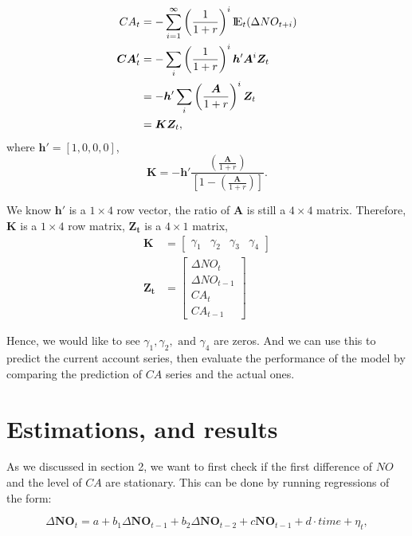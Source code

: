 \documentclass[12pt]{article}
\begin{document}
\begin{align*}
CA_{t} &=  - \sum\limits_{i = 1} ^\infty \left( \frac{1}{1 + r} \right) ^{i}
{\rm I\!{E}}_{t}(\Delta NO_{t + i})\\
\bm{CA}_{t}' &=  - \sum\limits_{i} \left( \frac{1}{1 + r} \right)^{i} \bm{h}'\bm{A}^{i}
\bm{Z}_{t}\\
 &= - \bm{h}' \sum\limits_{i} \left( \frac{\bm{A}}{1 + r} \right)^{i} \bm{Z}_{t}\\
 &= \bm{K} \bm{Z}_{t},
\end{align*}
where $ \bm{h}' = [1,0,0,0] $,
\begin{equation*}
\bm{K} =  - \bm{h}' \frac{\left( \frac{\bm{A}}{1 + r} \right) }{
		\left[ 1 - \left( \frac{\bm{A}}{1 + r} \right)  \right] 
}.
\end{equation*}



We know $ \bm{h}' $ is a $ 1  \times 4 $ row vector, the ratio of $ \bm{A} $ is still
a $ 4  \times 4 $ matrix. Therefore, $ \bm{K} $ is a $ 1  \times 4 $ row matrix, 
$ \bm{Z_{t}} $ is a $ 4  \times  1 $ matrix,
\begin{align*}
		\bm{K} &= \begin{bmatrix}
				\gamma_1 &\gamma_2 &\gamma_3 &\gamma_4
		\end{bmatrix}\\
		\bm{Z_{t}} &= \begin{bmatrix}
				\Delta NO_{t}\\
				\Delta NO_{t - 1}\\
				CA_{t}\\
				CA_{t - 1}
		\end{bmatrix}
\end{align*}

Hence, we would like to see $ \gamma_1, \gamma_2, \text{ and } \gamma_4 $ are zeros.
And we can use this to predict the current account series, then evaluate the performance
of the model by comparing the prediction of $ CA $ series and the actual ones.



\section{Estimations, and results}
As we discussed in section 2, we want to first check if the first difference of $ NO $
and the level of $ CA $ are stationary. This can be done by running regressions
of the form:

\begin{equation}
\Delta \bm{NO}_{t} = a + b_1 \Delta \bm{NO}_{t - 1} + b_2 \Delta \bm{NO}_{t - 2} + c
\bm{NO}_{t - 1} + d \cdot time  + \eta_{t},
\end{equation}
\end{document}

